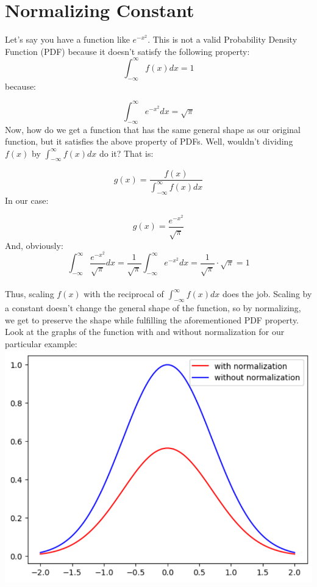 \documentclass{article}
\begin{document}
\section*{Normalizing Constant}

Let's say you have a function like $e^{-x^2}$. This is not a valid Probability Density Function (PDF) because it doesn't satisfy the following property: 
\[\int_{-\infty}^{\infty}f(x)dx=1\]
because:

\[\int_{-\infty}^{\infty}e^{-x^2}dx=\sqrt{\pi}\]
Now, how do we get a function that has the same general shape as our original function, but it satisfies the above property of PDFs. Well, wouldn't dividing $f(x)$ by $\int_{-\infty}^{\infty}f(x)dx$ do it? That is:

\[g(x)=\frac{f(x)}{\int_{-\infty}^{\infty}f(x)dx}\]
In our case:

\[g(x)=\frac{e^{-x^2}}{\sqrt{\pi}}\]
And, obviously:
\[\int_{-\infty}^{\infty}\frac{e^{-x^2}}{\sqrt{\pi}}dx=\frac{1}{\sqrt{\pi}}\int_{-\infty}^{\infty}e^{-x^2}dx=\frac{1}{\sqrt{\pi}}\cdot\sqrt{\pi}=1\]\\
Thus, scaling $f(x)$ with the reciprocal of $\int_{-\infty}^{\infty}f(x)dx$ does the job. Scaling by a constant doesn't change the general shape of the function, so by normalizing, we get to preserve the shape while fulfilling the aforementioned PDF property. Look at the graphs of the function with and without normalization for our particular example:\\

\includegraphics[scale=0.3]{graph}
\centering
\end{document}
